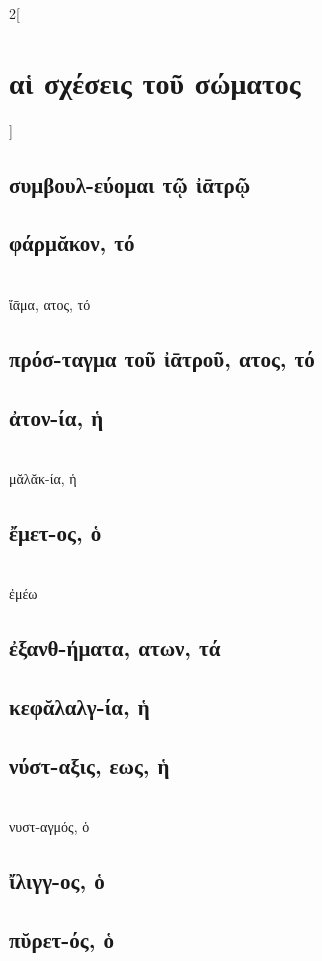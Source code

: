 \documentclass{book}
\begin{document}
\begin{multicols}{2}[\section{αἱ σχέσεις τοῦ σώματος}]
\subsection{συμβουλ-εύομαι τῷ ἰᾱτρῷ}
\subsection{φάρμᾰκον, τό}  ~\\
ἴᾱμα, ατος, τό 
\subsection{πρόσ-ταγμα τοῦ ἰᾱτροῦ, ατος, τό}
\subsection{ἀτον-ία, ἡ}  ~\\
μᾰλᾰκ-ία, ἡ 
\subsection{ἔμετ-ος, ὁ}   ~\\
ἐμέω  
\subsection{ἐξανθ-ήματα, ατων, τά}
\subsection{κεφᾰλαλγ-ία, ἡ}
\subsection{νύστ-αξις, εως, ἡ}  ~\\
νυστ-αγμός, ὁ 
\subsection{ἴλιγγ-ος, ὁ} 
\subsection{πῠρετ-ός, ὁ}
~
\end{multicols}
\newpage
\end{document}
